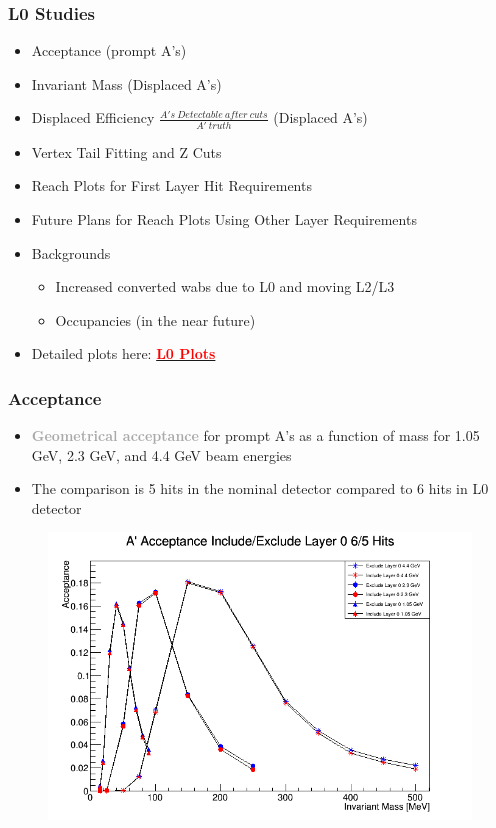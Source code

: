 \documentclass{beamer}
\begin{document}

\begin{frame}
\frametitle{L0 Studies}
\begin{itemize}
\item Acceptance (prompt A's)
\item Invariant Mass (Displaced A's)
\item Displaced Efficiency $\frac{A's \ Detectable \ after \ cuts}{A' \ truth}$ (Displaced A's)
\item Vertex Tail Fitting and Z Cuts
\item Reach Plots for First Layer Hit Requirements
\item Future Plans for Reach Plots Using Other Layer Requirements
\item Backgrounds
\begin{itemize}
\item Increased converted wabs due to L0 and moving L2/L3
\item Occupancies (in the near future)
\end{itemize}
\item Detailed plots here: \href{https://confluence.slac.stanford.edu/display/hpsg/Layer+0+Studies}{\textcolor{red}{\textbf{L0 Plots}}}
\end{itemize}

\end{frame}


\begin{frame}
\frametitle{Acceptance}
\begin{itemize}
\item \textcolor{darkgray}{\textbf{Geometrical acceptance}} for prompt A's as a function of mass for 1.05 GeV, 2.3 GeV, and 4.4 GeV beam energies
\item The comparison is 5 hits in the nominal detector compared to 6 hits in L0 detector
\end{itemize}
\begin{figure}
\includegraphics[width=0.6\linewidth]{figs/TridentAcceptanceInL0ExL05hit.png}
\end{figure}

\end{frame}
\end{document}
